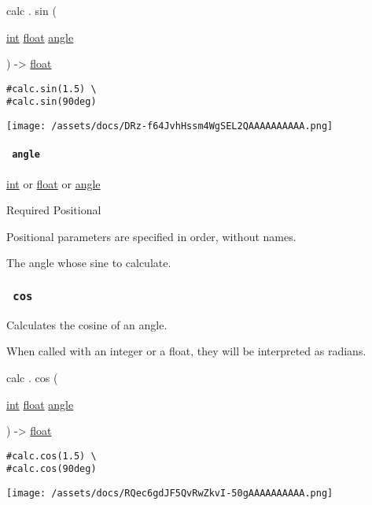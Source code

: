 calc { . } { sin } (

{ \href{/docs/reference/foundations/int/}{int}
\href{/docs/reference/foundations/float/}{float}
\href{/docs/reference/layout/angle/}{angle} }

) -\textgreater{} \href{/docs/reference/foundations/float/}{float}

\begin{verbatim}
#calc.sin(1.5) \
#calc.sin(90deg)
\end{verbatim}

\texttt{[image: /assets/docs/DRz-f64JvhHssm4WgSEL2QAAAAAAAAAA.png]}

\paragraph{\texorpdfstring{\texttt{\ angle\ }}{ angle }}\label{functions-sin-angle}

\href{/docs/reference/foundations/int/}{int} {or}
\href{/docs/reference/foundations/float/}{float} {or}
\href{/docs/reference/layout/angle/}{angle}

{Required} {{ Positional }}

\label{functions-sin-angle-positional-tooltip}
Positional parameters are specified in order, without names.

The angle whose sine to calculate.

\subsubsection{\texorpdfstring{\texttt{\ cos\ }}{ cos }}\label{functions-cos}

Calculates the cosine of an angle.

When called with an integer or a float, they will be interpreted as
radians.

calc { . } { cos } (

{ \href{/docs/reference/foundations/int/}{int}
\href{/docs/reference/foundations/float/}{float}
\href{/docs/reference/layout/angle/}{angle} }

) -\textgreater{} \href{/docs/reference/foundations/float/}{float}

\begin{verbatim}
#calc.cos(1.5) \
#calc.cos(90deg)
\end{verbatim}

\texttt{[image: /assets/docs/RQec6gdJF5QvRwZkvI-50gAAAAAAAAAA.png]}

